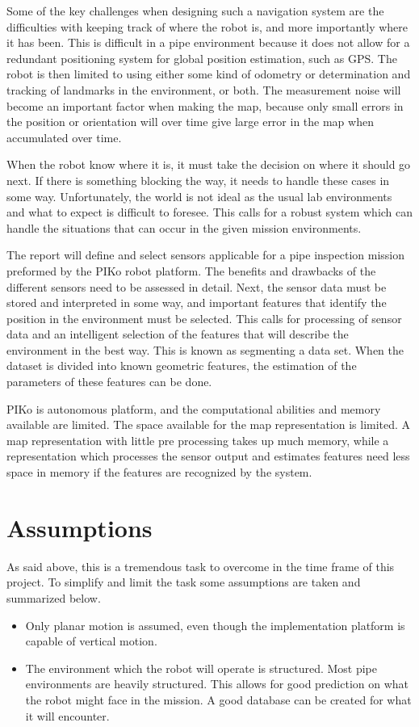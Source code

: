 Some of the key challenges when designing such a navigation system are the difficulties
with keeping track of where the robot is, and more importantly where it has been. This is
difficult in a pipe environment because it does not allow for a redundant positioning
system for global position estimation, such as GPS. The robot is then limited to using
either some kind of odometry or determination and tracking of landmarks in the environment, 
or both. The measurement noise will become an important factor when making the map,
because only small errors in the position or orientation will over time give large error
in the map when accumulated over time. \cite{thrun}

When the robot know where it is, it must take the decision on where it should go next. If
there is something blocking the way, it needs to handle these cases in some way.
Unfortunately, the world is not ideal as the usual lab environments and what to expect is
difficult to foresee. 
This calls for a robust system which can handle the situations that can
occur in the given mission environments. 

The report will define and select sensors applicable for a pipe inspection mission
preformed by the PIKo robot platform. The benefits and drawbacks of the different sensors
need to be assessed in detail. Next, the sensor data must be stored and interpreted in some
way, and important features that identify the position in the environment must be selected. 
This calls for processing of sensor data and an intelligent selection of the features that
will describe the environment in the best way. This is known as segmenting a data set.
When the dataset is divided into known geometric features, the estimation of the
parameters of these features can be done. 

PIKo is autonomous platform, and the computational abilities and memory available
are limited. The space available for the map representation is limited.
A map representation with little pre processing takes up much memory, while a
representation which processes the sensor output and estimates features need less space in
memory if the features are recognized by the system. 


\section{Assumptions}
As said above, this is a tremendous task to overcome in the time frame of this project. To
simplify and limit the task some assumptions are taken and summarized below. 
\begin{itemize}
    \item Only planar motion is assumed, even though the implementation platform is
    capable of vertical motion. 
    \item The environment which the robot will operate is structured. Most pipe
    environments are heavily structured. This allows for good prediction on what the robot
    might face in the mission. A good database can be created for what it will encounter. 
\end{itemize}

